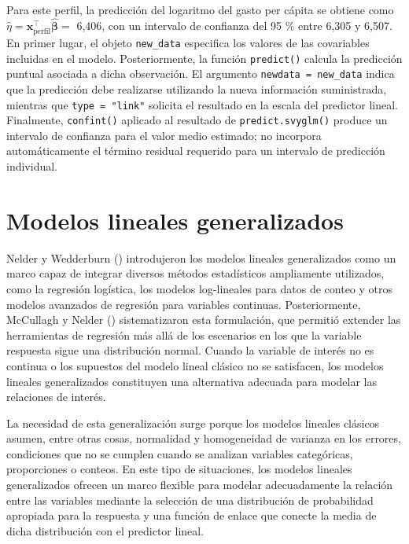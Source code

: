 \documentclass[
  spanish,
  11pt,
  letterpaper,
  oneside,
  open=any]{scrbook}
\begin{document}
Para este perfil, la predicción del logaritmo del gasto per cápita se
obtiene como
\(\hat\eta=\mathbf{x}_{\mathrm{perfil}}^{\top}\hat{\boldsymbol\beta}=\)
6,406, con un intervalo de confianza del 95 \% entre 6,305 y 6,507. En
primer lugar, el objeto \texttt{new\_data} especifica los valores de las
covariables incluidas en el modelo. Posteriormente, la función
\texttt{predict()} calcula la predicción puntual asociada a dicha
observación. El argumento \texttt{newdata\ =\ new\_data} indica que la
predicción debe realizarse utilizando la nueva información suministrada,
mientras que \texttt{type\ =\ "link"} solicita el resultado en la escala
del predictor lineal. Finalmente, \texttt{confint()} aplicado al
resultado de \texttt{predict.svyglm()} produce un intervalo de confianza
para el valor medio estimado; no incorpora automáticamente el término
residual requerido para un intervalo de predicción individual.


\chapter{Modelos lineales generalizados}\label{cap6}

Nelder y Wedderburn ()
introdujeron los modelos lineales generalizados como un marco capaz de
integrar diversos métodos estadísticos ampliamente utilizados, como la
regresión logística, los modelos log-lineales para datos de conteo y
otros modelos avanzados de regresión para variables continuas.
Posteriormente, McCullagh y Nelder
() sistematizaron esta
formulación, que permitió extender las herramientas de regresión más
allá de los escenarios en los que la variable respuesta sigue una
distribución normal. Cuando la variable de interés no es continua o los
supuestos del modelo lineal clásico no se satisfacen, los modelos
lineales generalizados constituyen una alternativa adecuada para modelar
las relaciones de interés.

La necesidad de esta generalización surge porque los modelos lineales
clásicos asumen, entre otras cosas, normalidad y homogeneidad de
varianza en los errores, condiciones que no se cumplen cuando se
analizan variables categóricas, proporciones o conteos. En este tipo de
situaciones, los modelos lineales generalizados ofrecen un marco
flexible para modelar adecuadamente la relación entre las variables
mediante la selección de una distribución de probabilidad apropiada para
la respuesta y una función de enlace que conecte la media de dicha
distribución con el predictor lineal.
\end{document}
